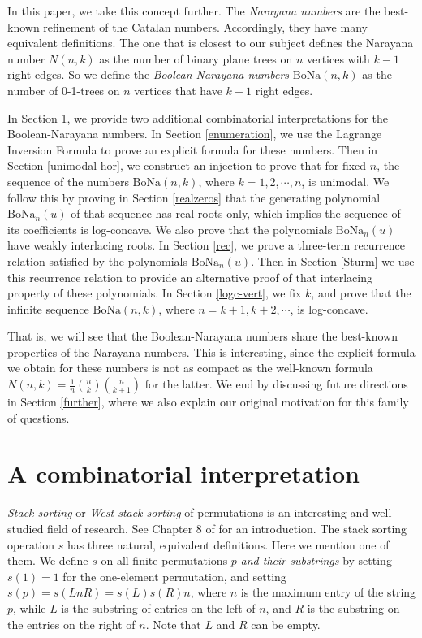 \documentclass[11pt]{article}
\newcommand{\bona}{\mathrm{BoNa}}
\begin{document}
In this paper, we take this concept further.  The {\em Narayana numbers} are the best-known refinement of the Catalan numbers. Accordingly, they have many equivalent
definitions. The one that is closest to our subject defines the Narayana number $N(n,k)$ as the number of binary plane trees on $n$ vertices with $k-1$ right edges. 
So we  define the {\em Boolean-Narayana numbers} $\bona(n,k)$ as the number of 0-1-trees on $n$ vertices that have $k-1$ right edges. 

In Section \ref{combinatorial}, we provide two additional combinatorial interpretations for the Boolean-Narayana numbers. In Section \ref{enumeration}, we use the Lagrange
Inversion Formula to prove an explicit formula for these numbers.  Then in Section \ref{unimodal-hor}, we construct an injection to prove that  for fixed $n$, the sequence of the numbers
$\bona(n,k)$, where $k=1,2,\cdots ,n$, is unimodal. We follow this by proving in Section \ref{realzeros} that the generating polynomial $\bona_n(u)$ of that sequence has real roots only, 
which implies the sequence of its coefficients is log-concave. We also prove that the polynomials $\bona_n(u)$ have weakly interlacing roots.  
 In Section \ref{rec}, we prove a three-term recurrence relation satisfied by
the polynomials $\bona_n(u)$. Then in Section \ref{Sturm} we use this recurrence relation to provide an alternative proof
of that interlacing property of these polynomials. 
 In Section \ref{logc-vert}, we fix $k$, and prove that the infinite sequence $\bona(n,k)$, where $n=k+1,k+2,\cdots $, is log-concave. 

That is, we will see that the Boolean-Narayana numbers share the best-known properties of the Narayana numbers. This is interesting, since the explicit formula we 
obtain for these numbers is not as compact as the well-known formula $N(n,k)=\frac{1}{n}{n\choose k}{n\choose k+1}$ for the latter.
We end by discussing future directions in Section \ref{further}, where we  also explain our original motivation for this family of questions. 

\section{A combinatorial interpretation}  \label{combinatorial}
{\em Stack sorting} or {\em West stack sorting} of permutations is an interesting and well-studied field of research. See Chapter 8 of \cite{combperm} for an introduction. 
The stack sorting operation $s$ has three natural,  equivalent definitions. Here we mention one of them. We define $s$ on all finite permutations $p$ {\em and their substrings} by setting $s(1)=1$ for the one-element permutation, and setting $s(p)=s(LnR)=s(L)s(R)n$, where $n$ is the maximum entry of the string $p$, while $L$ is the substring of entries on the left of $n$, and $R$ is the substring on the entries on the right of $n$. Note that $L$ and $R$ can be empty. 
\end{document}
